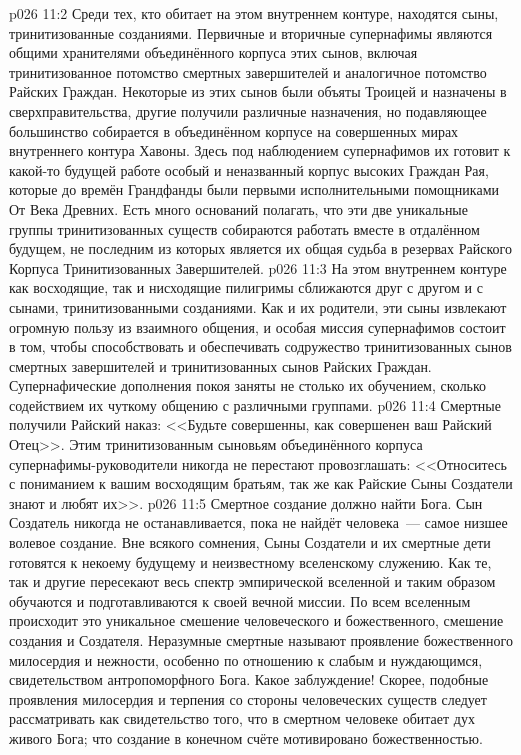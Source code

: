 \vs p026 11:2 \pc Среди тех, кто обитает на этом внутреннем контуре, находятся сыны, тринитизованные созданиями. Первичные и вторичные супернафимы являются общими хранителями объединённого корпуса этих сынов, включая тринитизованное потомство смертных завершителей и аналогичное потомство Райских Граждан. Некоторые из этих сынов были объяты Троицей и назначены в сверхправительства, другие получили различные назначения, но подавляющее большинство собирается в объединённом корпусе на совершенных мирах внутреннего контура Хавоны. Здесь под наблюдением супернафимов их готовит к какой\hyp{}то будущей работе особый и неназванный корпус высоких Граждан Рая, которые до времён Грандфанды были первыми исполнительными помощниками От Века Древних. Есть много оснований полагать, что эти две уникальные группы тринитизованных существ собираются работать вместе в отдалённом будущем, не последним из которых является их общая судьба в резервах Райского Корпуса Тринитизованных Завершителей.
\vs p026 11:3 На этом внутреннем контуре как восходящие, так и нисходящие пилигримы сближаются друг с другом и с сынами, тринитизованными созданиями. Как и их родители, эти сыны извлекают огромную пользу из взаимного общения, и особая миссия супернафимов состоит в том, чтобы способствовать и обеспечивать содружество тринитизованных сынов смертных завершителей и тринитизованных сынов Райских Граждан. Супернафические дополнения покоя заняты не столько их обучением, сколько содействием их чуткому общению с различными группами.
\vs p026 11:4 Смертные получили Райский наказ: <<Будьте совершенны, как совершенен ваш Райский Отец>>. Этим тринитизованным сыновьям объединённого корпуса супернафимы\hyp{}руководители никогда не перестают провозглашать: <<Относитесь с пониманием к вашим восходящим братьям, так же как Райские Сыны Создатели знают и любят их>>.
\vs p026 11:5 \pc Смертное создание должно найти Бога. Сын Создатель никогда не останавливается, пока не найдёт человека~--- самое низшее волевое создание. Вне всякого сомнения, Сыны Создатели и их смертные дети готовятся к некоему будущему и неизвестному вселенскому служению. Как те, так и другие пересекают весь спектр эмпирической вселенной и таким образом обучаются и подготавливаются к своей вечной миссии. По всем вселенным происходит это уникальное смешение человеческого и божественного, смешение создания и Создателя. Неразумные смертные называют проявление божественного милосердия и нежности, особенно по отношению к слабым и нуждающимся, свидетельством антропоморфного Бога. Какое заблуждение! Скорее, подобные проявления милосердия и терпения со стороны человеческих существ следует рассматривать как свидетельство того, что в смертном человеке обитает дух живого Бога; что создание в конечном счёте мотивировано божественностью.
